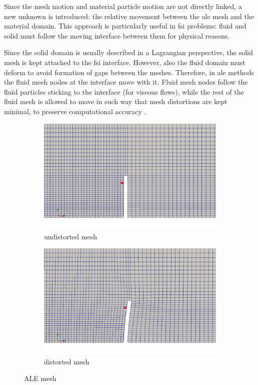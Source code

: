 Since the mesh motion and material particle motion are not directly linked, a new unknown is introduced:  the relative movement between the \acrshort{ale} mesh and the material domain. This approach is particularly useful in \acrshort{fsi} problems: fluid and solid must follow the moving interface between them for physical reasons.

Since the solid domain is usually described in a Lagrangian perspective, the solid mesh is kept attached to the \acrshort{fsi} interface. However, also the fluid domain must deform to avoid formation of gaps between the meshes. Therefore, in \acrshort{ale} methods the fluid mesh nodes at the interface move with it. Fluid mesh nodes follow the fluid particles sticking to the interface (for viscous flows), while the rest of the fluid mesh is allowed to move in such way that mesh distortions are kept minimal, to preserve computational accuracy \cite{ramm1998fluid}.

\begin{figure}[htbp!]
	\centering
	\begin{subfigure}{.5\textwidth}
		\centering
		\includegraphics[width=.99\linewidth]{images/undist}
		\caption{undistorted mesh}
		\label{fig:undist}
	\end{subfigure}%
	\begin{subfigure}{.5\textwidth}
		\centering
		\includegraphics[width=.99\linewidth]{images/dist}
		\caption{distorted mesh}
		\label{fig:dist}
	\end{subfigure}
	\caption{ALE mesh}
	\label{fig:ale-mesh}
\end{figure}

